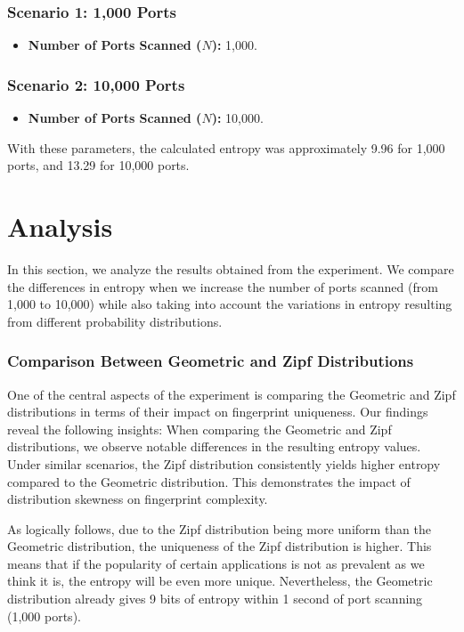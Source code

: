 \subsubsection{Scenario 1: 1,000 Ports}

\begin{itemize}
\item \textbf{Number of Ports Scanned (\(N\)):} 1,000.
\end{itemize}

\subsubsection{Scenario 2: 10,000 Ports}

\begin{itemize}
\item \textbf{Number of Ports Scanned (\(N\)):} 10,000.
\end{itemize}

With these parameters, the calculated entropy was approximately 9.96 for 1,000 ports, and 13.29 for 10,000 ports.

\section{Analysis}

In this section, we analyze the results obtained from the experiment. We compare the differences in entropy when we increase the number of ports scanned (from 1,000 to 10,000) while also taking into account the variations in entropy resulting from different probability distributions. 

\subsubsection{Comparison Between Geometric and Zipf Distributions}

One of the central aspects of the experiment is comparing the Geometric and Zipf distributions in terms of their impact on fingerprint uniqueness. Our findings reveal the following insights: When comparing the Geometric and Zipf distributions, we observe notable differences in the resulting entropy values. Under similar scenarios, the Zipf distribution consistently yields higher entropy compared to the Geometric distribution. This demonstrates the impact of distribution skewness on fingerprint complexity. 

As logically follows, due to the Zipf distribution being more uniform than the Geometric distribution, the uniqueness of the Zipf distribution is higher. This means that if the popularity of certain applications is not as prevalent as we think it is, the entropy will be even more unique. Nevertheless, the Geometric distribution already gives 9 bits of entropy within 1 second of port scanning (1,000 ports).

